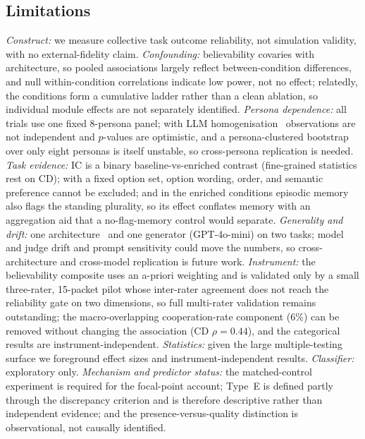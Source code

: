 \documentclass[runningheads]{llncs}
\begin{document}
\subsection{Limitations}
\emph{Construct:} we measure collective task outcome reliability, not simulation validity, with no external-fidelity claim. \emph{Confounding:} believability covaries with architecture, so pooled associations largely reflect between-condition differences, and null within-condition correlations indicate low power, not no effect; relatedly, the conditions form a cumulative ladder rather than a clean ablation, so individual module effects are not separately identified. \emph{Persona dependence:} all trials use one fixed 8-persona panel; with LLM homogenisation~\cite{wu2026boundary} observations are not independent and $p$-values are optimistic, and a persona-clustered bootstrap over only eight personas is itself unstable, so cross-persona replication is needed. \emph{Task evidence:} IC is a binary baseline-vs-enriched contrast (fine-grained statistics rest on CD); with a fixed option set, option wording, order, and semantic preference cannot be excluded; and in the enriched conditions episodic memory also flags the standing plurality, so its effect conflates memory with an aggregation aid that a no-flag-memory control would separate. \emph{Generality and drift:} one architecture~\cite{park2023generative} and one generator (GPT-4o-mini) on two tasks; model and judge drift and prompt sensitivity could move the numbers, so cross-architecture and cross-model replication is future work. \emph{Instrument:} the believability composite uses an a-priori weighting and is validated only by a small three-rater, 15-packet pilot whose inter-rater agreement does not reach the reliability gate on two dimensions, so full multi-rater validation remains outstanding; the macro-overlapping cooperation-rate component (6\%) can be removed without changing the association (CD $\rho=0.44$), and the categorical results are instrument-independent. \emph{Statistics:} given the large multiple-testing surface we foreground effect sizes and instrument-independent results. \emph{Classifier:} exploratory only. \emph{Mechanism and predictor status:} the matched-control experiment is required for the focal-point account; Type~E is defined partly through the discrepancy criterion and is therefore descriptive rather than independent evidence; and the presence-versus-quality distinction is observational, not causally identified.
\end{document}
